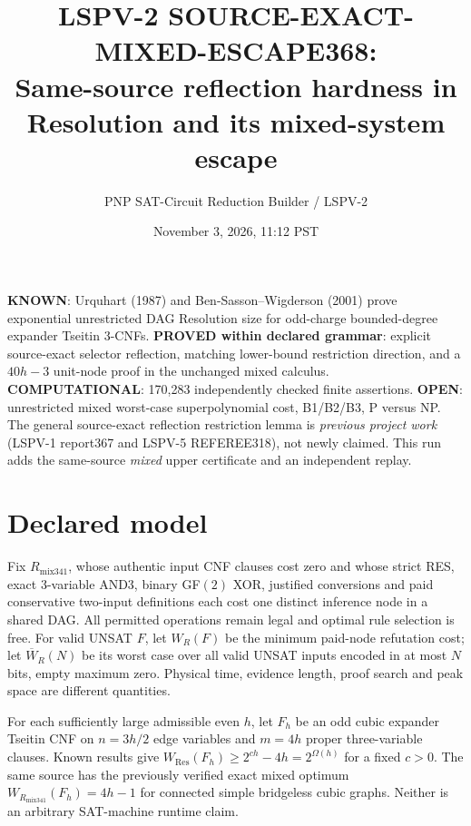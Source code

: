 \documentclass{article}
\title{LSPV-2 SOURCE-EXACT-MIXED-ESCAPE368:\\ Same-source reflection hardness in Resolution and its mixed-system escape}
\author{PNP SAT-Circuit Reduction Builder / LSPV-2}
\date{November 3, 2026, 11:12 PST}
\begin{document}
\maketitle
\noindent\textbf{KNOWN}: Urquhart (1987) and Ben-Sasson--Wigderson (2001) prove exponential unrestricted DAG Resolution size for odd-charge bounded-degree expander Tseitin 3-CNFs. \textbf{PROVED within declared grammar}: explicit source-exact selector reflection, matching lower-bound restriction direction, and a $40h-3$ unit-node proof in the unchanged mixed calculus. \textbf{COMPUTATIONAL}: 170,283 independently checked finite assertions. \textbf{OPEN}: unrestricted mixed worst-case superpolynomial cost, B1/B2/B3, P versus NP. The general source-exact reflection restriction lemma is \emph{previous project work} (LSPV-1 report367 and LSPV-5 REFEREE318), not newly claimed. This run adds the same-source \emph{mixed} upper certificate and an independent replay.

\section*{Declared model}
Fix $R_{\mathrm{mix341}}$, whose authentic input CNF clauses cost zero and whose strict RES, exact 3-variable AND3, binary GF$(2)$ XOR, justified conversions and paid conservative two-input definitions each cost one distinct inference node in a shared DAG. All permitted operations remain legal and optimal rule selection is free. For valid UNSAT $F$, let $W_R(F)$ be the minimum paid-node refutation cost; let $\overline W_R(N)$ be its worst case over all valid UNSAT inputs encoded in at most $N$ bits, empty maximum zero. Physical time, evidence length, proof search and peak space are different quantities.

For each sufficiently large admissible even $h$, let $F_h$ be an odd cubic expander Tseitin CNF on $n=3h/2$ edge variables and $m=4h$ proper three-variable clauses. Known results give $W_{\mathrm{Res}}(F_h)\ge2^{ch}-4h=2^{\Omega(h)}$ for a fixed $c>0$. The same source has the previously verified exact mixed optimum $W_{R_{\mathrm{mix341}}}(F_h)=4h-1$ for connected simple bridgeless cubic graphs. Neither is an arbitrary SAT-machine runtime claim.
\end{document}
